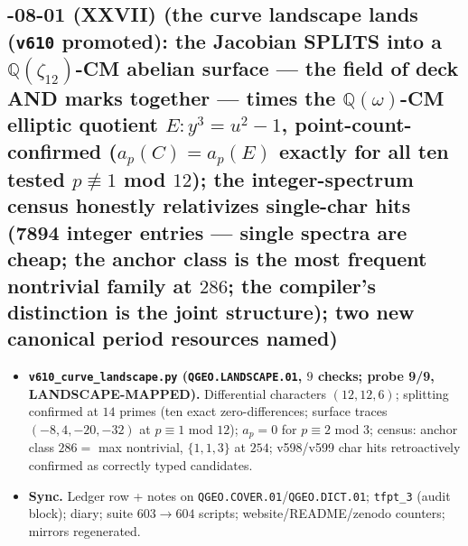 \documentclass[11pt]{article}
\begin{document}
\subsection*{-08-01 (XXVII) (the curve landscape lands (\texttt{v610} promoted): the Jacobian SPLITS into a $\mathbb{Q}(\zeta_{12})$-CM abelian surface --- the field of deck AND marks together --- times the $\mathbb{Q}(\omega)$-CM elliptic quotient $E: y^3=u^2-1$, point-count-confirmed ($a_p(C)=a_p(E)$ exactly for all ten tested $p\not\equiv1$ mod $12$); the integer-spectrum census honestly relativizes single-char hits (7894 integer entries --- single spectra are cheap; the anchor class is the most frequent nontrivial family at $286$; the compiler's distinction is the joint structure); two new canonical period resources named)}
\begin{itemize}[leftmargin=1.5em]
\item \textbf{\texttt{v610\_curve\_landscape.py} (\texttt{QGEO.LANDSCAPE.01}, $9$ checks; probe
9/9, LANDSCAPE-MAPPED).} Differential characters $(12,12,6)$; splitting confirmed at $14$
primes (ten exact zero-differences; surface traces $(-8,4,-20,-32)$ at $p\equiv1$ mod $12$);
$a_p=0$ for $p\equiv2$ mod $3$; census: anchor class $286=$ max nontrivial, $\{1,1,3\}$ at
$254$; v598/v599 char hits retroactively confirmed as correctly typed candidates.
\item \textbf{Sync.} Ledger row + notes on \texttt{QGEO.COVER.01}/\texttt{QGEO.DICT.01};
\texttt{tfpt\_3} (audit block); diary; suite $603\to604$ scripts; website/README/zenodo
counters; mirrors regenerated.
\end{itemize}
\end{document}
